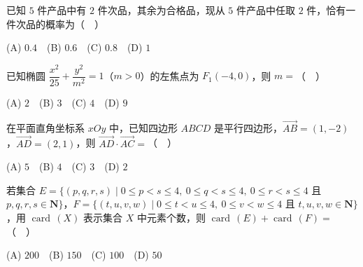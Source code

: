 \begin{question}
已知 \(5\) 件产品中有 \(2\) 件次品，其余为合格品，现从 \(5\) 件产品中任取 \(2\) 件，恰有一件次品的概率为（　）

(A) \(0.4\)　(B) \(0.6\)　(C) \(0.8\)　(D) \(1\)

\end{question}
\begin{question}
已知椭圆 \(\dfrac{x^2}{25}+\dfrac{y^2}{m^2}=1\)（\(m>0\)）的左焦点为 \(F_1(-4,0)\)，则 \(m=\)（　）

\par\vspace*{3pt}

(A) \(2\)　(B) \(3\)　(C) \(4\)　(D) \(9\)

\end{question}
\begin{question}
在平面直角坐标系 \(xOy\) 中，已知四边形 \(ABCD\) 是平行四边形，\(\overrightarrow{AB}=(1,-2)\)，\(\overrightarrow{AD}=(2,1)\)，则 \(\overrightarrow{AD}\cdot\overrightarrow{AC}=\)（　）

(A) \(5\)　(B) \(4\)　(C) \(3\)　(D) \(2\)

\end{question}
\begin{question}
若集合 \(E=\{(p,q,r,s)\mid 0\leqslant p<s\leqslant 4,\ 0\leqslant q<s\leqslant 4,\ 0\leqslant r<s\leqslant 4\) 且 \(p,q,r,s\in\mathbf{N}\}\)，\(F=\{(t,u,v,w)\mid 0\leqslant t<u\leqslant 4,\ 0\leqslant v<w\leqslant 4\) 且 \(t,u,v,w\in\mathbf{N}\}\)，用 \(\operatorname{card}\,(X)\) 表示集合 \(X\) 中元素个数，则 \(\operatorname{card}\,(E)+\operatorname{card}\,(F)=\)（　）

(A) \(200\)　(B) \(150\)　(C) \(100\)　(D) \(50\)

\end{question}

